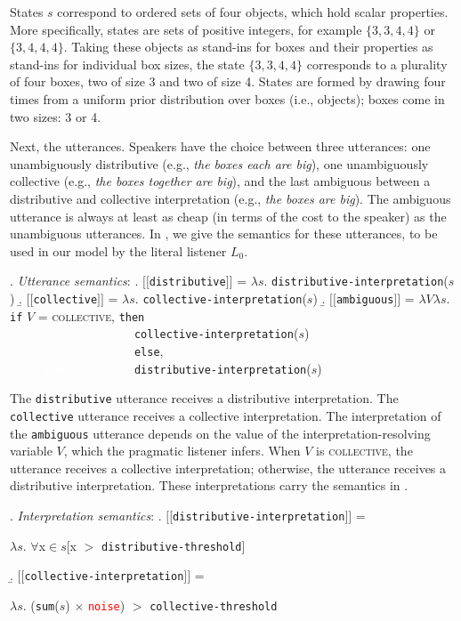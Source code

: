 \documentclass[linguex]{sp}
\newcommand{\sem}[1]{\mbox{$[\![$#1$]\!]$}}
\newcommand{\lam}{$\lambda$}
\begin{document}
 States $s$ correspond to ordered sets of four objects, which hold scalar properties. More specifically, states are sets of positive integers, for example $\{3, 3, 4, 4\}$ or $\{3, 4, 4, 4\}$. Taking these objects as stand-ins for boxes and their properties as stand-ins for individual box sizes, the state $\{3, 3, 4, 4\}$ corresponds to a plurality of four boxes, two of size 3 and two of size 4. States are formed by drawing four times from a uniform prior distribution over boxes (i.e., objects); boxes come in two sizes: 3 or 4.
 
 Next, the utterances. Speakers have the choice between three utterances: one {unambiguously distributive} (e.g., \emph{the boxes each are big}), one {unambiguously collective} (e.g., \emph{the boxes together are big}), and the last {ambiguous} between a distributive and collective interpretation (e.g., \emph{the boxes are big}). The ambiguous utterance is always at least as cheap (in terms of the cost to the speaker) as the unambiguous utterances. In \Next, we give the semantics for these utterances, to be used in our model by the literal listener $L_{0}$.
 
 \ex. \emph{Utterance semantics}:
 \a. \sem{\texttt{distributive}} = \lam $s$. \texttt{distributive-interpretation}($s$)
 \b. \sem{\texttt{collective}} = \lam $s$. \texttt{collective-interpretation}($s$)
 \b. \sem{\texttt{ambiguous}} = \lam $V$\lam $s$. \texttt{if} $V$ = \textsc{collective}, \texttt{then}\\  \textcolor{white}{\sem{\texttt{ambiguous}} = \lam $V$\lam $s$. }\texttt{collective-interpretation}($s$)\\
 \textcolor{white}{\sem{\texttt{ambiguous}} = \lam $V$\lam $s$. }\texttt{else}, \\
 \textcolor{white}{\sem{\texttt{ambiguous}} = \lam $V$\lam $s$. }\texttt{distributive-interpretation}($s$)
 
 The \texttt{distributive} utterance receives a distributive interpretation. The \texttt{collective} utterance receives a collective interpretation. The interpretation of the \texttt{ambiguous} utterance depends on the value of the interpretation-resolving variable $V$, which the pragmatic listener infers. When $V$ is \textsc{collective}, the utterance receives a collective interpretation; otherwise, the utterance receives a distributive interpretation. These interpretations carry the semantics in \Next.
 
 \ex. \emph{Interpretation semantics}:
 \a. \sem{\texttt{distributive-interpretation}} =
\begin{flushright}\lam $s$. $\forall$x$\in$$s$[x $>$ \texttt{distributive-threshold}]\end{flushright}
\b. \sem{\texttt{collective-interpretation}} = 
\begin{flushright}\lam $s$. (\texttt{sum}($s$) $\times$ \textcolor{red}{\texttt{noise}}) $>$ \texttt{collective-threshold}\end{flushright}
\end{document}
